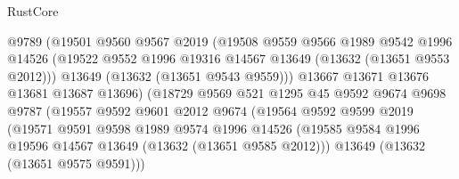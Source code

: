 \begin{lexlean}{RustCore}
\begin{coremodule}
                              @9789
                              (@19501
                                @9560
                                @9567
                                @2019
                                (@19508
                                  @9559
                                  @9566
                                  @1989
                                  @9542
                                  @1996
                                  @14526
                                  (@19522
                                    @9552
                                    @1996
                                    @19316
                                    @14567
                                    @13649
                                    (@13632 (@13651 @9553 @2012)))
                                  @13649
                                  (@13632 (@13651 @9543 @9559)))
                                @13667
                                @13671
                                @13676
                                @13681
                                @13687
                                @13696)
                              (@18729
                                @9569
                                @521
                                @1295
                                @45
                                @9592
                                @9674
                                @9698
                                @9787
                                (@19557
                                  @9592
                                  @9601
                                  @2012
                                  @9674
                                  (@19564
                                    @9592
                                    @9599
                                    @2019
                                    (@19571
                                      @9591
                                      @9598
                                      @1989
                                      @9574
                                      @1996
                                      @14526
                                      (@19585
                                        @9584
                                        @1996
                                        @19596
                                        @14567
                                        @13649
                                        (@13632 (@13651 @9585 @2012)))
                                      @13649
                                      (@13632 (@13651 @9575 @9591)))

\end{coremodule}
\end{lexlean}
